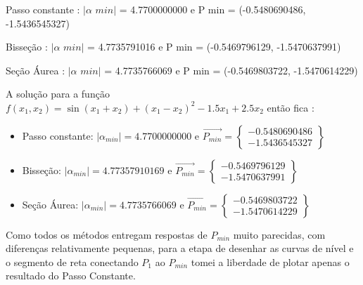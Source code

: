 \documentclass[10pt, a4paper]{article}
\begin{document}
Passo constante : $|\alpha \,\, min|$ = 4.7700000000 e P min = (-0.5480690486, -1.5436545327)

Bisseção        : $|\alpha \,\, min|$ = 4.7735791016 e P min = (-0.5469796129, -1.5470637991)

Seção Áurea     : $|\alpha \,\,  min|$ = 4.7735766069 e P min = (-0.5469803722, -1.5470614229)

A solução para a função $f(x_1, x_2) = \sin{(x_1 + x_2)} + (x_1 - x_2)^2 - 1.5x_1 + 2.5x_2$ então fica :
\newline

\begin{itemize}
  \item Passo constante: $|\alpha_{min}| = 4.7700000000$ e $\overrightarrow{P_{min}} =  
  \begin{Bmatrix}
    -0.5480690486 \\ -1.5436545327
  \end{Bmatrix}$
  \item Bisseção: $|\alpha_{min}| = 4.77357910169$ e $\overrightarrow{P_{min}} =  
  \begin{Bmatrix}
    -0.5469796129 \\ -1.5470637991
  \end{Bmatrix}$
  \item Seção Áurea: $|\alpha_{min}| = 4.7735766069$ e $\overrightarrow{P_{min}} =  
  \begin{Bmatrix}
    -0.5469803722 \\ -1.5470614229
  \end{Bmatrix}$
\end{itemize}

Como todos os métodos entregam respostas de $P_{min}$ muito parecidas, com diferenças relativamente pequenas,
para a etapa de desenhar as curvas de nível e o segmento de reta conectando $P_1$ ao $P_{min}$ tomei a liberdade
de plotar apenas o resultado do Passo Constante.
\end{document}
